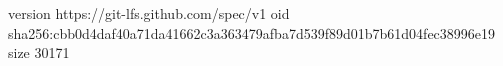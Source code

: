 version https://git-lfs.github.com/spec/v1
oid sha256:cbb0d4daf40a71da41662c3a363479afba7d539f89d01b7b61d04fec38996e19
size 30171
